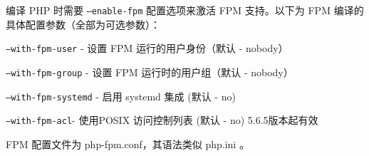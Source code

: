 编译 PHP 时需要 \texttt{--enable-fpm} 配置选项来激活 FPM 支持。以下为 FPM 编译的具体配置参数（全部为可选参数）：

\begin{compactitem}
\item \texttt{--with-fpm-user} - 设置 FPM 运行的用户身份（默认 - nobody）

\item \texttt{--with-fpm-group} - 设置 FPM 运行时的用户组（默认 - nobody）

\item \texttt{--with-fpm-systemd} - 启用 systemd 集成 (默认 - no)

\item \texttt{--with-fpm-acl}- 使用POSIX 访问控制列表 (默认 - no) 5.6.5版本起有效
\end{compactitem}

FPM 配置文件为 php-fpm.conf，其语法类似 php.ini 。


